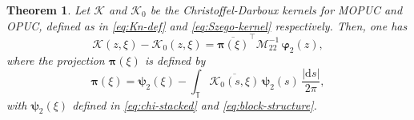 \documentclass[a4paper,10pt,leqno]{amsart}
\numberwithin{equation}{section}
\newtheorem{theorem}{Theorem}[section]
\theoremstyle{remark}
\newcommand{\dd}{\mathrm{d}}
\newcommand{\TT}{\mathbb{T}}
\newcommand{\red}[1]{{\color{red} #1}}
\begin{document}
\begin{theorem}\label{thm:kernel}
Let $\mathcal K$ and $\mathcal K_0$ be the Christoffel-Darboux kernels for MOPUC and OPUC, defined as in \eqref{eq:Kn-def} and \eqref{eq:Szego-kernel} respectively. Then, one has
\begin{equation}\label{eq:kernel-reduction}
\mathcal K(z,\xi) - \mathcal K_0(z,\xi) = \overline{\bm{\pi}(\xi)}^\top \bm{\mathcal M}_{22}^{-1} \,
\bm{\varphi}_2(z),
\end{equation}
where the projection $\bm{\pi}(\xi)$ is defined by
\begin{equation}\label{eq:q-def}
\bm{\pi}(\xi) = \bm{\psi}_2(\xi) - \int_{\TT}  \overline{\mathcal K_0 (s,\xi)} \, \bm{\psi}_2(s) \, \frac{|\dd s|}{2\pi},
\end{equation}
with $\bm{\psi}_2(\xi)$ defined in \eqref{eq:chi-stacked} and \eqref{eq:block-structure}.
\end{theorem}

\end{document}
